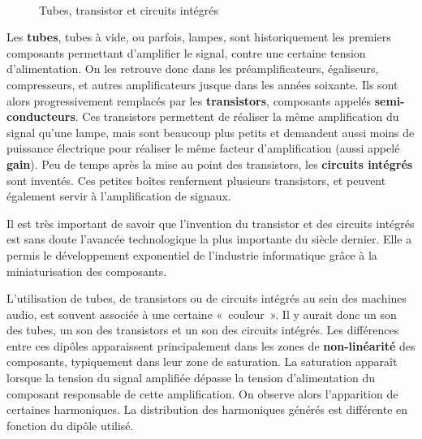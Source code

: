 \documentclass[
  letterpaper,
  DIV=11,
  numbers=noendperiod]{scrreprt}
\begin{document}
\begin{figure}
\begin{minipage}[t]{0.26\linewidth}
{{}

}

\end{minipage}%
%
\begin{minipage}[t]{0.11\linewidth}

{\centering 

~

}

\end{minipage}%

\caption{\label{fig-composants}Tubes, transistor et circuits intégrés}

\end{figure}

Les \textbf{tubes}, tubes à vide, ou parfois, lampes, sont
historiquement les premiers composants permettant d'amplifier le signal,
contre une certaine tension d'alimentation. On les retrouve donc dans
les préamplificateurs, égaliseurs, compresseurs, et autres
amplificateurs jusque dans les années soixante. Ils sont alors
progressivement remplacés par les \textbf{transistors}, composants
appelés \textbf{semi-conducteurs}. Ces transistors permettent de
réaliser la même amplification du signal qu'une lampe, mais sont
beaucoup plus petits et demandent aussi moins de puissance électrique
pour réaliser le même facteur d'amplification (aussi appelé
\textbf{gain}). Peu de temps après la mise au point des transistors, les
\textbf{circuits intégrés} sont inventés. Ces petites boîtes renferment
plusieurs transistors, et peuvent également servir à l'amplification de
signaux.

Il est très important de savoir que l'invention du transistor et des
circuits intégrés est sans doute l'avancée technologique la plus
importante du siècle dernier. Elle a permis le développement exponentiel
de l'industrie informatique grâce à la miniaturisation des composants.

L'utilisation de tubes, de transistors ou de circuits intégrés au sein
des machines audio, est souvent associée à une certaine «~couleur~». Il
y aurait donc un son des tubes, un son des transistors et un son des
circuits intégrés. Les différences entre ces dipôles apparaissent
principalement dans les zones de \textbf{non-linéarité} des composants,
typiquement dans leur zone de saturation. La saturation apparaît lorsque
la tension du signal amplifiée dépasse la tension d'alimentation du
composant responsable de cette amplification. On observe alors
l'apparition de certaines harmoniques. La distribution des harmoniques
générés est différente en fonction du dipôle utilisé.
\end{document}
